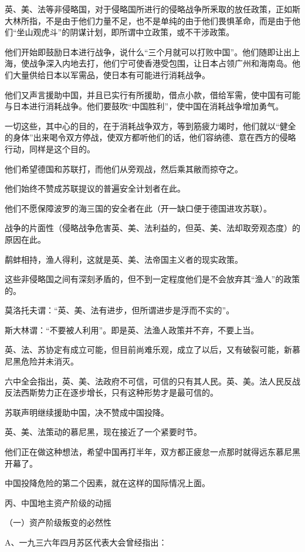 英、美、法等非侵略国，对于侵略国所进行的侵略战争所釆取的放任政策，正如斯大林所指，不是由于他们力量不足，也不是单纯的由于他们畏惧革命，而是由于他们“坐山观虎斗”的阴谋计划，即所谓中立政策，或不干涉政策。

他们开始即鼓励日本进行战争，说什么“三个月就可以打败中国”。他们随即让出上海，使战争深入内地去打，他们宁可使香港受包围，让日本占领广州和海南岛。他们大量供给日本以军需品，使日本有可能进行消耗战争。

他们又声言援助中国，并且已实行有所援助，借点小款，借给军需，使中国有可能与日本进行消耗战争。他们要鼓吹“中国胜利”，使中国在消耗战争增加勇气。

一切这些，其中心的目的，在于消耗战争双方，等到筋疲力竭时，他们就以“健全的身体”出来喝令双方停战，使双方都听他们的话，他们容纳德、意在西方的侵略行动，同样是这个目的。

他们希望德国和苏联打，而他们从旁观战，然后乘其敝而掠夺之。

他们始终不赞成苏联提议的普遍安全计划者在此。

他们不愿保障波罗的海三国的安全者在此（开一缺口便于德国进攻苏联）。

战争的片面性（侵略战争危害英、美、法利益的，但英、美、法却取旁观态度）的原因在此。

鹬蚌相持，渔人得利，这就是英、美、法帝国主义者的现实政策。

这些非侵略国之间有深刻矛盾的，但不到一定程度他们是不会放弃其“渔人”的政策的。

莫洛托夫谓：“英、美、法有进步，但所谓进步是浮而不实的”。

斯大林谓：“不要被人利用”。即是英、法渔人政策并不弃，不要上当。

英、法、苏协定有成立可能，但目前尚难乐观，成立了以后，又有破裂可能，新慕尼黑危险并未消灭。

六中全会指出，英、美、法政府不可信，可信的只有其人民。英、美。法人民反战反法西斯势力正在逐步增长，只有这种形势才是最可信的。

苏联声明继续援助中国，决不赞成中国投降。

英、美、法策动的慕尼黑，现在接近了一个紧要时节。

他们正在做这种想法，希望中国再打半年，双方都正疲怠一点那时就得远东慕尼黑开幕了。

中国投降危险的第二个因素，就在这样的国际情况上面。

丙、中国地主资产阶级的动摇

（一）资产阶级叛变的必然性

A、一九三六年四月苏区代表大会曾经指出：

